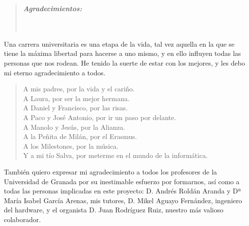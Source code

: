 \cleardoublepage
{}
{}

\vspace*{2.5cm}


\begin{quotation}
\noindent \begin{center}
\textbf{\emph{\Large Agradecimientos:}}\textbf{\emph{\large }}\\
\textbf{\emph{\large }}\\
\textbf{\emph{\large }}\\
\textbf{\emph{\large }}
\par\end{center}{\large \par}
\end{quotation}

\begin{onehalfspace}

Una carrera universitaria es una etapa de la vida, tal vez aquella en la que se tiene la máxima libertad para hacerse a uno mismo, y en ello influyen todas las personas que nos rodean. He tenido la suerte de estar con los mejores, y les debo mi eterno agradecimiento a todos.

\begin{quote}
	A mis padres, por la vida y el cariño. \\
	A Laura, por ser la mejor hermana. \\
	A Daniel y Francisco, por las risas. \\
	A Paco y José Antonio, por ir un paso por delante. \\
	A Manolo y Jesús, por la Alianza. \\
	A la Peñita de Milán, por el Erasmus. \\
	A los Milestones, por la música. \\
	Y a mi tío Salva, por meterme en el mundo de la informática.
\end{quote}

También quiero expresar mi agradecimiento a todos los profesores de la Universidad de Granada por su inestimable esfuerzo por formarnos, así como a todas las personas implicadas en este proyecto: D. Andrés Roldán Aranda y Dª María Isabel García Arenas, mis tutores, D. Mikel Aguayo Fernández, ingeniero del hardware, y el organista D. Juan Rodríguez Ruiz, nuestro más valioso colaborador.

\end{onehalfspace}


\clearpage{\pagestyle{empty}\cleardoublepage}%
